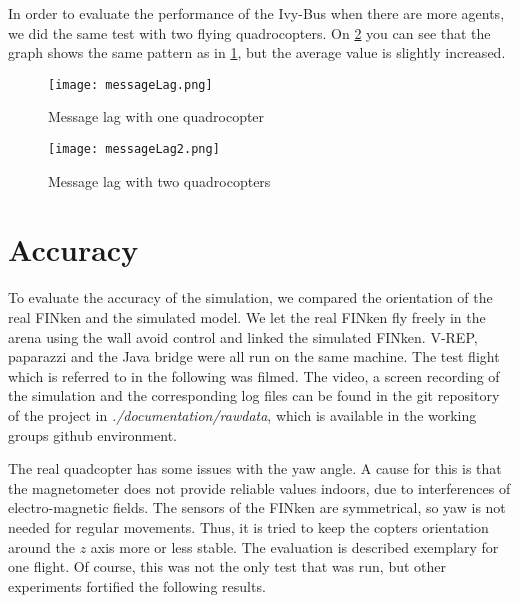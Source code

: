 In order to evaluate the performance of the Ivy-Bus when there are more agents, we did the same test with two flying quadrocopters. 
On \ref{fig:messageLag2} you can see that the graph shows the same pattern as in \ref{fig:messageLag}, but the average value is slightly increased.

\begin{figure}[h!]
 \begin{center}
  \texttt{[image: messageLag.png]}
 \end{center}
  \caption{Message lag with one quadrocopter\label{fig:messageLag}}
\end{figure}

\begin{figure}[h!]
 \begin{center}
  \texttt{[image: messageLag2.png]}
 \end{center}
  \caption{Message lag with two quadrocopters\label{fig:messageLag2}}
\end{figure}



\section{Accuracy}
\label{sec:accuracy}
To evaluate the accuracy of the simulation, we compared the orientation of the real FINken and the simulated model.  
We let the real FINken fly freely in the arena using the wall avoid control and linked the simulated FINken.
V-REP, paparazzi and the Java bridge were all run on the same machine.
The test flight which is referred to in the following was filmed.
The video, a screen recording of the simulation and the corresponding log files can be found in the git repository of the project in \emph{./documentation/rawdata}, which is available in the working groups github environment.

The real quadcopter has some issues with the yaw angle. 
A cause for this is that the magnetometer does not provide reliable values indoors, due to interferences of electro-magnetic fields.
The sensors of the FINken are symmetrical, so yaw is not needed for regular movements.
Thus, it is tried to keep the copters orientation around the $z$ axis more or less stable.
The evaluation is described exemplary for one flight. 
Of course, this was not the only test that was run, but other experiments fortified the following results.

